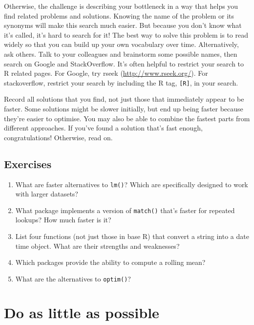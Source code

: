 \documentclass[]{book}
\renewcommand{\href}[2]{#2 (\url{#1})}
\begin{document}
Otherwise, the challenge is describing your bottleneck in a way that helps you find related problems and solutions. Knowing the name of the problem or its synonyms will make this search much easier. But because you don't know what it's called, it's hard to search for it! The best way to solve this problem is to read widely so that you can build up your own vocabulary over time. Alternatively, ask others. Talk to your colleagues and brainstorm some possible names, then search on Google and StackOverflow. It's often helpful to restrict your search to R related pages. For Google, try \href{http://www.rseek.org/}{rseek}. For stackoverflow, restrict your search by including the R tag, \texttt{{[}R{]}}, in your search.

Record all solutions that you find, not just those that immediately appear to be faster. Some solutions might be slower initially, but end up being faster because they're easier to optimise. You may also be able to combine the fastest parts from different approaches. If you've found a solution that's fast enough, congratulations! Otherwise, read on.

\hypertarget{exercises-18}{%
\subsection{Exercises}\label{exercises-18}}

\begin{enumerate}
\def\labelenumi{\arabic{enumi}.}
\item
  What are faster alternatives to \texttt{lm()}? Which are specifically designed
  to work with larger datasets?
\item
  What package implements a version of \texttt{match()} that's faster for
  repeated lookups? How much faster is it?
\item
  List four functions (not just those in base R) that convert a string into a
  date time object. What are their strengths and weaknesses?
\item
  Which packages provide the ability to compute a rolling mean?
\item
  What are the alternatives to \texttt{optim()}?
\end{enumerate}

\hypertarget{be-lazy}{%
\section{Do as little as possible}\label{be-lazy}}
\end{document}
